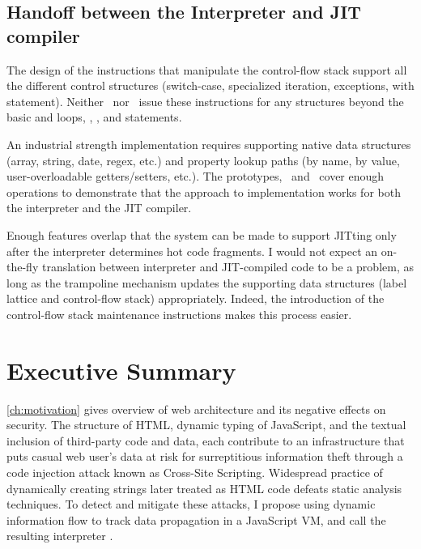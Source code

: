 \subsection{Handoff between the Interpreter and JIT compiler}

The design of the instructions that manipulate the control-flow stack support all the different control structures (switch-case, specialized iteration, exceptions, with statement).
Neither \FlowCore\ nor \JitFlow\ issue these instructions for any structures beyond the basic  and  loops, , , and  statements.

An industrial strength implementation requires supporting native data structures (array, string, date, regex, etc.) and property lookup paths (by name, by value, user-overloadable getters/setters, etc.).
The prototypes, \FlowCore\ and \JitFlow\ cover enough operations to demonstrate that the approach to implementation works for both the interpreter and the JIT compiler.

Enough features overlap that the system can be made to support JITting only after the interpreter determines hot code fragments.
I would not expect an on-the-fly translation between interpreter and JIT-compiled code to be a problem, as long as the trampoline mechanism updates the supporting data structures (label lattice and control-flow stack) appropriately.
Indeed, the introduction of the control-flow stack maintenance instructions makes this process easier.

\section{Executive Summary}

\autoref{ch:motivation} gives overview of web architecture and its negative effects on security.
The structure of HTML, dynamic typing of JavaScript, and the textual inclusion of third-party code and data, each contribute to an infrastructure that puts casual web user's data at risk for surreptitious information theft through a code injection attack known as Cross-Site Scripting.
Widespread practice of dynamically creating strings later treated as HTML code defeats static analysis techniques.
To detect and mitigate these attacks, I propose using dynamic information flow to track data propagation in a JavaScript VM, and call the resulting interpreter \FlowCore.


